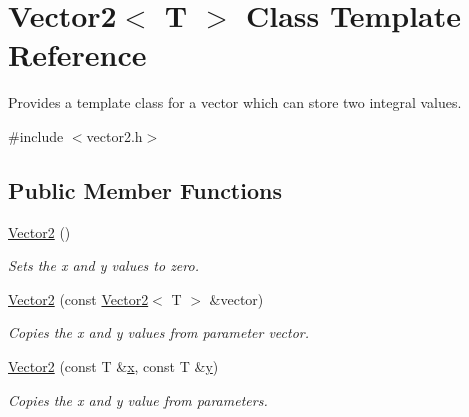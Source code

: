 \hypertarget{class_vector2}{}\section{Vector2$<$ T $>$ Class Template Reference}
\label{class_vector2}


Provides a template class for a vector which can store two integral values.  




{\ttfamily \#include $<$vector2.\+h$>$}

\subsection*{Public Member Functions}
\begin{DoxyCompactItemize}
\item 
\mbox{\label{class_vector2_ae2f1223cb0d664aa73afb789086a4174}} 
\mbox{\hyperlink{class_vector2_ae2f1223cb0d664aa73afb789086a4174}{Vector2}} ()
\begin{DoxyCompactList}\small\item\em Sets the x and y values to zero. \end{DoxyCompactList}\item 
\mbox{\hyperlink{class_vector2_afa4bd612e378da7ce0e367179d923301}{Vector2}} (const \mbox{\hyperlink{class_vector2}{Vector2}}$<$ T $>$ \&vector)
\begin{DoxyCompactList}\small\item\em Copies the x and y values from parameter vector. \end{DoxyCompactList}\item 
\mbox{\hyperlink{class_vector2_ae1eb7e93804f74959b1d0e568e4f4bd9}{Vector2}} (const T \&\mbox{\hyperlink{class_vector2_a78fa1f2ed5e261c7fbeb8f3536a1ee34}{x}}, const T \&\mbox{\hyperlink{class_vector2_a6cfed8355591aa269f4dba43bd806ef9}{y}})
\begin{DoxyCompactList}\small\item\em Copies the x and y value from parameters. \end{DoxyCompactList}\end{DoxyCompactItemize}
